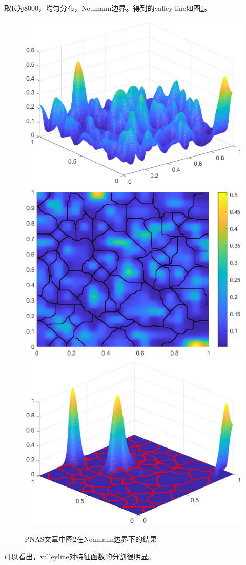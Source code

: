 \documentclass[UTF8,12pt]{article}
\begin{document}
取K为8000，均匀分布，Neumann边界。得到的valley line如图\ref{v1}。
\begin{figure}[htbp]
    \centering
    \includegraphics[width=0.3\linewidth]{pic/pf2-1}
    \includegraphics[width=0.3\linewidth]{pic/pf2-2}
    \includegraphics[width=0.3\linewidth]{pic/pf2-3}
    \label{v1}
\caption{PNAS文章中图2在Neumann边界下的结果}
\end{figure}
可以看出，valleyline对特征函数的分割很明显。
\end{document}
